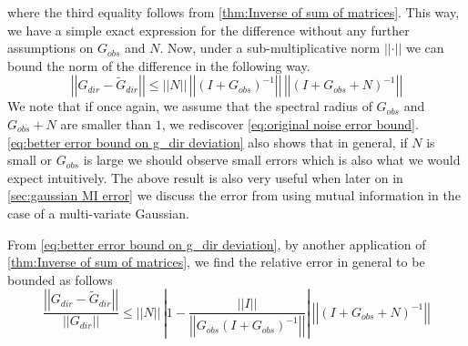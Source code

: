 \documentclass[../Thesis.tex]{subfiles}
\begin{document}
where the third equality follows from \autoref{thm:Inverse of sum of matrices}. This way, we have a simple exact expression for the difference without any further assumptions on $G_{obs}$ and $N$. Now, under a sub-multiplicative norm $\left|\left|\cdot\right|\right|$ we can bound the norm of the difference in the following way.
\begin{equation}\label{eq:better error bound on g_dir deviation}
    \left|\left|G_{dir} - \tilde{G}_{dir}\right|\right| \leq \left|\left| N \right|\right| \, \left|\left| \left(I + G_{obs}\right)^{-1} \right|\right|\, \left|\left| \left(I + G_{obs} + N\right)^{-1} \right|\right|
\end{equation}
We note that if once again, we assume that the spectral radius of $G_{obs}$ and $G_{obs} + N$ are smaller than $1$, we rediscover \autoref{eq:original noise error bound}. \autoref{eq:better error bound on g_dir deviation} also shows that in general, if $N$ is small or $G_{obs}$ is large we should observe small errors which is also what we would expect intuitively. The above result is also very useful when later on in \autoref{sec:gaussian MI error} we discuss the error from using mutual information in the case of a multi-variate Gaussian.

From \autoref{eq:better error bound on g_dir deviation}, by another application of \autoref{thm:Inverse of sum of matrices}, we find the relative error in general to be bounded as follows
$$\frac{\left|\left|G_{dir} - \tilde{G}_{dir}\right|\right|}{\left|\left|G_{dir}\right|\right|} \leq \left|\left| N \right|\right| \, \left|1 - \frac{\left|\left| I \right|\right|}{\left|\left| G_{obs} \left(I +G_{obs}\right)^{-1} \right|\right|} \right|\, \left|\left| \left(I + G_{obs} + N\right)^{-1} \right|\right|$$
\end{document}
